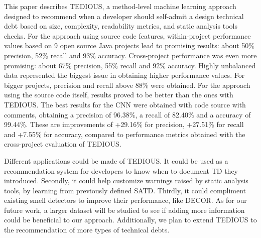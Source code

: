 
This paper describes \ac{TEDIOUS}, a method-level machine learning approach designed to recommend when a developer should self-admit a design technical debt based on size, complexity, readability metrics, and static analysis tools checks. For the approach using source code features, within-project performance values based on 9 open source Java projects lead to promising results: about 50\% precision, 52\% recall and 93\% accuracy. Cross-project performance was even more promising: about 67\% precision, 55\% recall and 92\% accuracy. Highly unbalanced data represented the biggest issue in obtaining higher performance values. For bigger projects, precision and recall above 88\% were obtained. For the approach using the source code itself, results proved to be better than the ones with TEDIOUS. The best results for the CNN were obtained with code source with comments, obtaining a precision of 96.38\%, a recall of 82.40\% and a accuracy of 99.44\%. These are improvements of +29.16\% for precision, +27.51\% for recall and +7.55\% for accuracy, compared to performance metrics obtained with the cross-project evaluation of TEDIOUS.

Different applications could be made of \ac{TEDIOUS}. It could be used as a recommendation system for developers to know when to document \ac{TD} they introduced. Secondly, it could help customize warnings raised by static analysis tools, by learning from previously defined \ac{SATD}. Thirdly, it could compliment existing smell detectors to improve their performance, like \ac{DECOR}. As for our future work, a larger dataset will be studied to see if adding more information could be beneficial to our approach. Additionally, we plan to extend \ac{TEDIOUS} to the recommendation of more types of technical debts.




